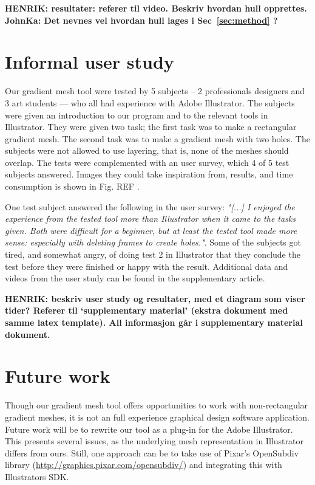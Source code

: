 \documentclass{egpubl}
\newcommand{\note}[3]{{\color{#2}\textbf{#1: #3}}}
\newcommand{\henrik}[1]{\note{HENRIK}{WildStrawberry}{#1}}
\newcommand{\john}[1]{\note{JohnKa}{RubineRed}{#1}}
\begin{document}
\henrik{resultater: referer til video. Beskriv hvordan hull opprettes.}
\john{Det nevnes vel hvordan hull lages i Sec~\ref{sec:method} ?}

\section{Informal user study}
\label{sec:evaluation}

Our gradient mesh tool were tested by 5 subjects -- 2 professionals designers and 3 art students --- who all had experience with Adobe Illustrator. The subjects were given an introduction to our program and to the relevant tools in Illustrator. They were given two task; the first task was to make a rectangular gradient mesh. The second task was to make a gradient mesh with two holes. The subjects were not allowed to use layering, that is, none of the meshes should overlap. The tests were complemented with an user survey, which 4 of 5 test subjects answered. Images they could take inspiration from, results, and time consumption is shown in Fig. REF . 

One test subject answered the following in the user survey: \textit{"[...] I enjoyed the experience from the tested tool more than Illustrator when it came to the tasks given. Both were difficult for a beginner, but at least the tested tool made more sense: especially with deleting frames to create holes."}. Some of the subjects got tired, and somewhat angry, of doing test 2 in Illustrator that they conclude the test before they were finished or happy with the result. Additional data and videos from the user study can be found in the supplementary article. 

\henrik{beskriv user study og resultater, med et diagram som viser tider? Referer til `supplementary material' (ekstra dokument med samme latex template). All informasjon går i supplementary material dokument.}

\section{Future work}
\label{sec:FW}

Though our gradient mesh tool offers opportunities to work with non-rectangular gradient meshes, it is not an full experience graphical design software application. Future work will be to rewrite our tool as a plug-in for the Adobe Illustrator. This presents several issues, as the underlying mesh representation in Illustrator differs from ours. Still, one approach can be to take use of Pixar's OpenSubdiv library (\url{http://graphics.pixar.com/opensubdiv/}) and integrating this with Illustrators SDK.
\end{document}
